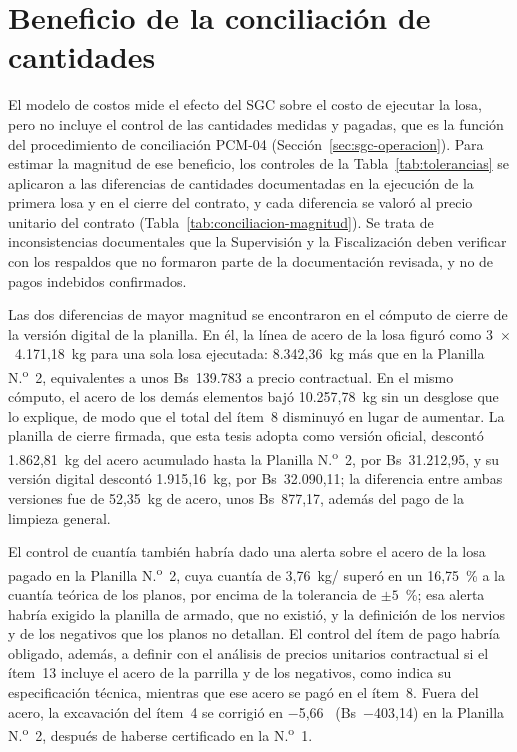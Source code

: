 \section{Beneficio de la conciliación de cantidades}
\label{sec:res-conciliacion}

El modelo de costos mide el efecto del SGC sobre el costo de ejecutar la losa, pero no incluye el control de las cantidades medidas y pagadas, que es la función del procedimiento de conciliación PCM-04 (Sección~\ref{sec:sgc-operacion}). Para estimar la magnitud de ese beneficio, los controles de la Tabla~\ref{tab:tolerancias} se aplicaron a las diferencias de cantidades documentadas en la ejecución de la primera losa y en el cierre del contrato, y cada diferencia se valoró al precio unitario del contrato (Tabla~\ref{tab:conciliacion-magnitud}). Se trata de inconsistencias documentales que la Supervisión y la Fiscalización deben verificar con los respaldos que no formaron parte de la documentación revisada, y no de pagos indebidos confirmados.

Las dos diferencias de mayor magnitud se encontraron en el cómputo de cierre de la versión digital de la planilla. En él, la línea de acero de la losa figuró como 3~$\times$~4.171,18~kg para una sola losa ejecutada: 8.342,36~kg más que en la Planilla N.\textsuperscript{o}~2, equivalentes a unos Bs~139.783 a precio contractual. En el mismo cómputo, el acero de los demás elementos bajó 10.257,78~kg sin un desglose que lo explique, de modo que el total del ítem~8 disminuyó en lugar de aumentar. La planilla de cierre firmada, que esta tesis adopta como versión oficial, descontó 1.862,81~kg del acero acumulado hasta la Planilla N.\textsuperscript{o}~2, por Bs~31.212,95, y su versión digital descontó 1.915,16~kg, por Bs~32.090,11; la diferencia entre ambas versiones fue de 52,35~kg de acero, unos Bs~877,17, además del pago de la limpieza general.

El control de cuantía también habría dado una alerta sobre el acero de la losa pagado en la Planilla N.\textsuperscript{o}~2, cuya cuantía de 3,76~kg/\mdos{} superó en un 16,75~\% a la cuantía teórica de los planos, por encima de la tolerancia de $\pm 5$~\%; esa alerta habría exigido la planilla de armado, que no existió, y la definición de los nervios y de los negativos que los planos no detallan. El control del ítem de pago habría obligado, además, a definir con el análisis de precios unitarios contractual si el ítem~13 incluye el acero de la parrilla y de los negativos, como indica su especificación técnica, mientras que ese acero se pagó en el ítem~8. Fuera del acero, la excavación del ítem~4 se corrigió en $-$5,66~\mtres{} (Bs~$-$403,14) en la Planilla N.\textsuperscript{o}~2, después de haberse certificado en la N.\textsuperscript{o}~1.

